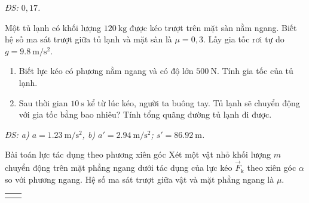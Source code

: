 \begin{tomtat}
\begin{vd}
\null\hfill\textit{ĐS: $0,17$.}
	\loigiai{}
\end{vd}
\begin{vd}
	Một tủ lạnh có khối lượng $\SI{120}{\kilogram}$ được kéo trượt trên mặt sàn nằm ngang. Biết hệ số ma sát trượt giữa tủ lạnh và mặt sàn là $\mu=0,3$. Lấy gia tốc rơi tự do $g=\SI{9.8}{\meter/\second^2}$.
	\begin{enumerate}[label=\alph*)]
		\item Biết lực kéo có phương nằm ngang và có độ lớn $\SI{500}{\newton}$. Tính gia tốc của tủ lạnh.
		\item Sau thời gian $\SI{10}{\second}$ kể từ lúc kéo, người ta buông tay. Tủ lạnh sẽ chuyển động với gia tốc bằng bao nhiêu? Tính tổng quãng đường tủ lạnh đi được.		
	\end{enumerate}
	\null\hfill\textit{ĐS: a) $a=\SI{1.23}{\meter/\second^2}$, b) $a'=\SI{2.94}{\meter/\second^2}$;  $s'=\SI{86.92}{\meter}$.}
\end{vd}
\begin{dang}{Bài toán lực tác dụng theo phương xiên góc}
	Xét một vật nhỏ khối lượng $m$ chuyển động trên mặt phẳng ngang dưới tác dụng của lực kéo $\vec{F}_{\mathrm{k}}$ theo xiên góc $\alpha$ so với phương ngang. Hệ số ma sát trượt giữa vật và mặt phẳng ngang là $\mu$.
\begin{center}
	\begin{longtable}{M{8cm}M{9cm}}
\end{longtable}
\end{center}
\end{dang}
\end{tomtat}
